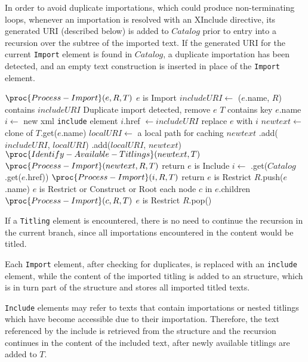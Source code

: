 \documentclass{IOS-Book-Article}
\begin{document}
In order to avoid duplicate importations, which could produce non-terminating loops, whenever an importation is resolved with an XInclude directive, its generated URI (described below) is added to $Catalog$ prior to entry into a recursion over the subtree of the imported text. If the generated URI for the current \texttt{Import} element is found in $Catalog$, a duplicate importation has been detected, and an empty text construction is inserted in place of the \texttt{Import} element.

\begin{codebox}
\li $\proc{Process-Import}(e, R, T)$
\li \If $e$ is Import
\li \Then
\li     $includeURI \gets$ ($e$.name, $R$) \label{li:call_generate-include-uri}
\li     \If {} contains $includeURI$
\li     \Then Duplicate import detected, remove $e$
\li     \Else
\li         \If $T$ contains key $e$.name
\li         \Then
\li             $i \gets $ new xml \texttt{include} element
\li             $i$.href $\gets includeURI$
\li             replace $e$ with $i$
\li             $newtext \gets$ clone of $T$.get($e$.name)
\li             $localURI \gets$ a local path for caching $newtext$
\li             {}.add($includeURI$, $localURI$)
\li             {}.add($localURI$, $newtext$)
\li             $\proc{Identify-Available-Titlings}(newtext, T)$
\li             $\proc{Process-Import}(newtext, R, T)$
\End %
\End %
\li     return
\End %
\li \If $e$ is Include
\li \Then
\li   $i \gets$ .get($Catalog$.get($e$.href))
\li   $\proc{Process-Import}(i, R, T)$
\li   return
\End %
\li \If $e$ is Restrict
\li \Then $R$.push($e$.name)
\End
\li \If $e$ is Restrict or Construct or Root
\li \Then 
\li    \For each node $c$ in $e$.children
\li    \Do $\proc{Process-Import}(c, R, T)$
\End
\End
\li \If $e$ is Restrict
\li \Then $R$.pop()
\End
\end{codebox}

If a \texttt{Titling} element is encountered, there is no need to continue the recursion in the current branch, since all importations encountered in the content would be titled.

Each \texttt{Import} element, after checking for duplicates, is replaced with an \texttt{include} element, while the content of the imported titling is added to an  structure, which is in turn part of the  structure and stores all imported titled texts. 

\texttt{Include} elements may refer to texts that contain importations or nested titlings which have become accessible due to their importation. Therefore, the text referenced by the include is retrieved from the  structure and the recursion continues in the content of the included text, after newly available titlings are added to $T$.
\end{document}
